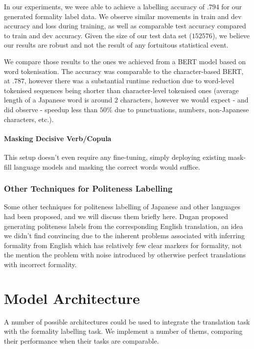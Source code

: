 \documentclass[11pt]{article}
\begin{document}
In our experiments, we were able to achieve a labelling accuracy of $.794$ for our generated formality label data. We observe similar movements in train and dev accuracy and loss during training, as well as comparable test accuracy compared to train and dev accuracy. Given the size of our test data set ($152576$), we believe our results are robust and not the result of any fortuitous statistical event.

We compare those results to the ones we achieved from a BERT model based on word tokenisation. The accuracy was comparable to the character-based BERT, at $.787$, however there was a substantial runtime reduction due to word-level tokenised sequences being shorter than character-level tokenised ones (average length of a Japanese word is around $2$ characters, however we would expect - and did observe - speedup less than $50\%$ due to punctuations, numbers, non-Japanese characters, etc.). 

\paragraph{Masking Decisive Verb/Copula}

This setup doesn't even require any fine-tuning, simply deploying existing mask-fill language models and masking the correct words would suffice. 

\subsubsection{Other Techniques for Politeness Labelling}

Some other techniques for politeness labelling of Japanese and other languages had been proposed, and we will discuss them briefly here. Dugan \cite{Dugan:20} proposed generating politeness labels from the corresponding English translation, an idea we didn't find convincing due to the inherent problems associated with inferring formality from English which has relatively few clear markers for formality, not the mention the problem with noise introduced by otherwise perfect translations with incorrect formality.

\section{Model Architecture}

A number of possible architectures could be used to integrate the translation task with the formality labelling task. We implement a number of thems, comparing their performance when their tasks are comparable.
\end{document}
